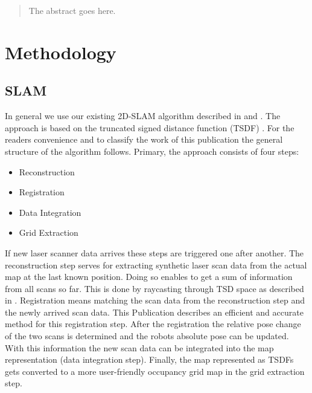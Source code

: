 \documentclass[conference]{IEEEtran}
\begin{document}




\maketitle

\begin{abstract}
The abstract goes here.
\end{abstract}


%
\IEEEpeerreviewmaketitle

\section{Methodology}

\subsection{SLAM}
In general we use our existing 2D-SLAM algorithm described in \cite{Koch2015} and \cite{May2014}. The approach is based on the truncated signed distance function (TSDF) . For the readers convenience and to classify the work of this publication the general structure of the algorithm follows. Primary, the approach consists of four steps: 
\begin{itemize}
	\item Reconstruction
	\item Registration
	\item Data Integration
	\item Grid Extraction
\end{itemize}
If new laser scanner data  arrives these steps are triggered one after another. The reconstruction step serves for extracting synthetic laser scan data from the actual map at the last known position. Doing so enables to get a sum of information from all scans so far. This is done by raycasting through TSD space as described in \cite{May2014}. Registration means matching the scan data from the reconstruction step and the newly arrived scan data. This Publication describes an efficient and accurate method for this registration step. After the registration the relative pose change of the two scans is determined and the robots absolute pose can be updated. With this information the new scan data can be integrated into the map representation (data integration step). Finally, the map represented as TSDFs gets converted to a more user-friendly occupancy grid map in the grid extraction step. \cite{May2014}
\end{document}
